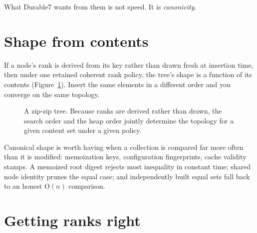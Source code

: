 \documentclass[11pt,twoside,openright]{book}
\newcommand{\bigoh}[1]{$\mathrm{O}(#1)$}
\begin{document}
What Durable7 wants from them is not speed. It is \emph{canonicity}.

\section{Shape from contents}

If a node's rank is derived from its key rather than drawn fresh at insertion
time, then under one retained coherent rank policy, the tree's shape is a
function of its contents (Figure~\ref{fig:zip}). Insert the same elements in a
different order and you converge on the same topology.

\begin{figure}[htbp]
\centering
{}
\caption{A zip-zip tree. Because ranks are derived rather than drawn, the search
order and the heap order jointly determine the topology for a given content set
under a given policy.}
\label{fig:zip}
\end{figure}

Canonical shape is worth having when a collection is compared far more often
than it is modified: memoization keys, configuration fingerprints, cache
validity stamps. A memoized root digest rejects most inequality in constant
time; shared node identity prunes the equal case; and independently built equal
sets fall back to an honest \bigoh{n} comparison.

\section{Getting ranks right}
\end{document}
